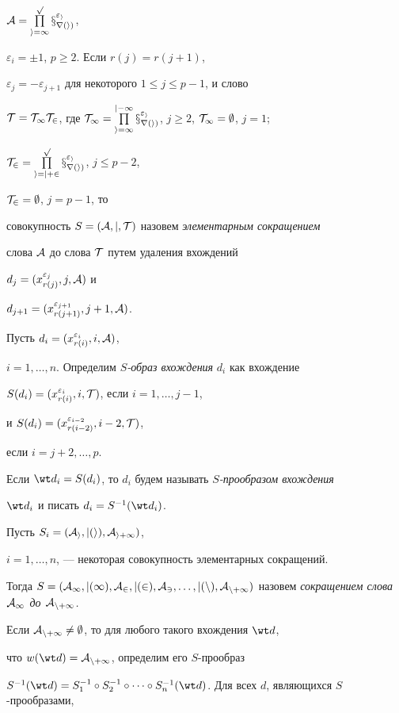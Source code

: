 $\cal A=\prod\limits_{i=1}^p x^{\varepsilon_i}_{r(i)}$,


$\varepsilon_i=\pm1$, $p\ge2$. Если $r(j)=r(j+1)$, 


$\varepsilon_{{j}}=-\varepsilon_{{j+1}}$ для некоторого $1\le j\le p-1$, и слово


$\cal T=\cal T_1 \cal T_2$, где $\cal T_1=\PL^{j-1}_{i=1}


x^{\varepsilon_i}_{r(i)}$, $j\ge2$, $\cal T_1=\emptyset$, $j=1$;


$\cal T_2=\prod\limits^p_{i=j+2}x^{\varepsilon_i}_{r(i)}$, $j\le p-2$,


$\cal T_2=\emptyset$, $j=p-1$, то


совокупность $S=(\cal A,j,\cal T)$ назовем {\it элементарным сокращением}


слова $\cal A$ до слова $\cal T$ путем удаления вхождений


$d_j=(x^{\varepsilon_j}_{r(j)},j,\cal A)$ и


$d_{j+1}=(x^{\varepsilon_{j+1}}_{r(j+1)},j+1,\cal A)$.


Пусть $d_i=(x^{\varepsilon_i}_{r(i)},i,\cal A)$,


$i=1,\dotsc,n$. Определим {\it $S$-образ вхождения} $d_i$ как вхождение


$S(d_i)=(x^{\varepsilon_i}_{r(i)},i,\cal T)$, если $i=1,\dotsc,j-1$, 


и $S(d_i)=(x^{\varepsilon_{i-2}}_{r(i-2)},i-2,\cal T)$,


если $i=j+2,\dotsc,p$.


Если $\wt d_i=S(d_i)$, то $d_i$ будем называть {\it $S$-прообразом вхождения}


$\wt d_i$ и писать $d_i=S^{-1}(\wt d_i)$.





Пусть $S_i=(\cal A_i,j(i),\cal A_{i+1})$,


$i=1,\dotsc,n$, --- некоторая совокупность элементарных сокращений.


Тогда $S=(\cal A_1,j(1),\cal A_2,j(2),\cal A_3,\dotsc,j(n),


\cal A_{n+1})$ назовем {\it сокращением слова $\cal A_1$ до $\cal A_{n+1}$.}


Если $\cal A_{n+1}\ne\emptyset$, то для любого такого вхождения $\wt d$,


что $w(\wt d)=\cal A_{n+1}$, определим его $S$-прообраз


$S^{-1}(\wt d)=S^{-1}_1\circ S^{-1}_{2}\circ \dotsb


\circ S^{-1}_n(\wt d)$. Для всех $d$, являющихся $S$-прообразами,


